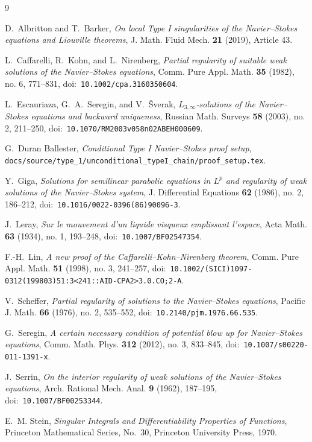 \documentclass[11pt]{amsart}
\theoremstyle{plain}
\theoremstyle{definition}
\theoremstyle{remark}
\begin{document}
\begin{thebibliography}{9}

D.~Albritton and T.~Barker,
\emph{On local Type I singularities of the Navier--Stokes equations and
Liouville theorems},
J. Math. Fluid Mech. \textbf{21} (2019), Article 43.

L.~Caffarelli, R.~Kohn, and L.~Nirenberg,
\emph{Partial regularity of suitable weak solutions of the Navier--Stokes
 equations},
Comm. Pure Appl. Math. \textbf{35} (1982), no. 6, 771--831,
doi:\ \nolinkurl{10.1002/cpa.3160350604}.

L.~Escauriaza, G.~A.~Seregin, and V.~{\v S}verak,
\emph{\(L_{3,\infty}\)-solutions of the Navier--Stokes equations and
 backward uniqueness},
Russian Math. Surveys \textbf{58} (2003), no. 2, 211--250,
doi:\ \nolinkurl{10.1070/RM2003v058n02ABEH000609}.

G.~Duran Ballester,
\emph{Conditional Type I Navier--Stokes proof setup},
\texttt{docs/source/type\_1/unconditional\_typeI\_chain/proof\_setup.tex}.

Y.~Giga,
\emph{Solutions for semilinear parabolic equations in \(L^p\) and regularity
 of weak solutions of the Navier--Stokes system},
J. Differential Equations \textbf{62} (1986), no. 2, 186--212,
doi:\ \nolinkurl{10.1016/0022-0396(86)90096-3}.

J.~Leray,
\emph{Sur le mouvement d'un liquide visqueux emplissant l'espace},
Acta Math. \textbf{63} (1934), no. 1, 193--248,
doi:\ \nolinkurl{10.1007/BF02547354}.

F.-H.~Lin,
\emph{A new proof of the Caffarelli--Kohn--Nirenberg theorem},
Comm. Pure Appl. Math. \textbf{51} (1998), no. 3, 241--257,
doi:\ \nolinkurl{10.1002/(SICI)1097-0312(199803)51:3<241::AID-CPA2>3.0.CO;2-A}.

V.~Scheffer,
\emph{Partial regularity of solutions to the Navier--Stokes equations},
Pacific J. Math. \textbf{66} (1976), no. 2, 535--552,
doi:\ \nolinkurl{10.2140/pjm.1976.66.535}.

G.~Seregin,
\emph{A certain necessary condition of potential blow up for Navier--Stokes
 equations},
Comm. Math. Phys. \textbf{312} (2012), no. 3, 833--845,
doi:\ \nolinkurl{10.1007/s00220-011-1391-x}.

J.~Serrin,
\emph{On the interior regularity of weak solutions of the Navier--Stokes
 equations},
Arch. Rational Mech. Anal. \textbf{9} (1962), 187--195,
doi:\ \nolinkurl{10.1007/BF00253344}.

E.~M. Stein,
\emph{Singular Integrals and Differentiability Properties of Functions},
Princeton Mathematical Series, No.~30, Princeton University Press, 1970.

\end{thebibliography}
\end{document}
